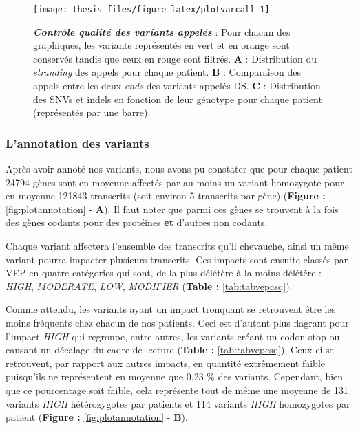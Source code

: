 \documentclass[12pt,a4paper,twoside]{ugathesis}
\theoremstyle{definition}
\theoremstyle{definition}
\theoremstyle{definition}
\theoremstyle{remark}
\begin{document}
\newpage

\begin{figure}

{\centering \texttt{[image: thesis\_files/figure-latex/plotvarcall-1]} 

}

\caption[Contrôle qualité des variants appelés]{\textbf{\emph{Contrôle qualité des variants appelés}}
: Pour chacun des graphiques, les variants représentés en vert et en
orange sont conservés tandis que ceux en rouge sont filtrés. \textbf{A}
: Distribution du \emph{stranding} des appels pour chaque patient.
\textbf{B} : Comparaison des appels entre les deux \emph{ends} des
variants appelés DS. \textbf{C} : Distribution des SNVs et indels en
fonction de leur génotype pour chaque patient (représentés par une
barre).}\label{fig:plotvarcall}
\end{figure}










\newpage

\subsubsection{L'annotation des
variants}\label{lannotation-des-variants-1}

Après avoir annoté nos variants, nous avons pu constater que pour chaque
patient 24794 gènes sont en moyenne affectés par au moins un variant
homozygote pour en moyenne 121843 transcrits (soit environ 5 transcrits
par gène) (\textbf{Figure : }\ref{fig:plotannotation} - \textbf{A}). Il
faut noter que parmi ces gènes se trouvent à la fois des gènes codants
pour des protéines \textbf{et} d'autres non codants.

Chaque variant affectera l'ensemble des transcrits qu'il chevauche,
ainsi un même variant pourra impacter plusieurs transcrits. Ces impacts
sont ensuite classés par VEP en quatre catégories qui sont, de la plus
délétère à la moins délétère : \emph{HIGH}, \emph{MODERATE}, \emph{LOW},
\emph{MODIFIER} (\textbf{Table : }\ref{tab:tabvepcsq}).

Comme attendu, les variants ayant un impact tronquant se retrouvent être
les moins fréquents chez chacun de nos patients. Ceci est d'autant plus
flagrant pour l'impact \emph{HIGH} qui regroupe, entre autres, les
variants créant un codon stop ou causant un décalage du cadre de lecture
(\textbf{Table : }\ref{tab:tabvepcsq}). Ceux-ci se retrouvent, par
rapport aux autres impacts, en quantité extrêmement faible puisqu'ils ne
représentent en moyenne que 0.23 \% des variants. Cependant, bien que ce
pourcentage soit faible, cela représente tout de même une moyenne de 131
variants \emph{HIGH} hétérozygotes par patients et 114 variants
\emph{HIGH} homozygotes par patient (\textbf{Figure :
}\ref{fig:plotannotation} - \textbf{B}).
\end{document}

